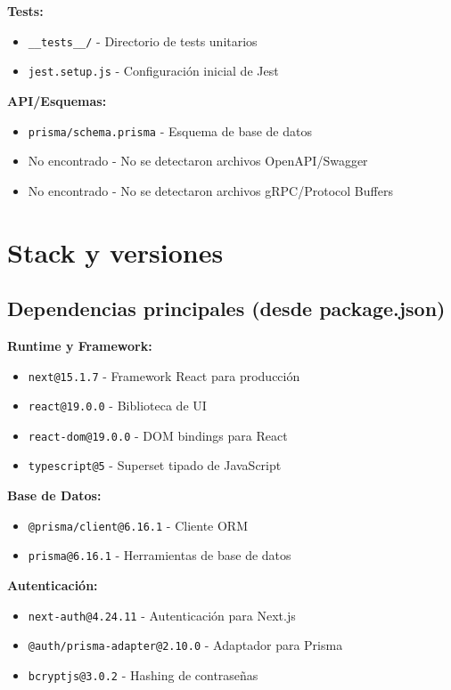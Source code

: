 \documentclass[12pt,a4paper]{article}
\begin{document}
\textbf{Tests:}
\begin{itemize}
    \item \texttt{\_\_tests\_\_/} - Directorio de tests unitarios
    \item \texttt{jest.setup.js} - Configuración inicial de Jest
\end{itemize}

\textbf{API/Esquemas:}
\begin{itemize}
    \item \texttt{prisma/schema.prisma} - Esquema de base de datos
    \item No encontrado - No se detectaron archivos OpenAPI/Swagger
    \item No encontrado - No se detectaron archivos gRPC/Protocol Buffers
\end{itemize}

\section{Stack y versiones}

\subsection{Dependencias principales (desde package.json)}

\textbf{Runtime y Framework:}
\begin{itemize}
    \item \texttt{next@15.1.7} - Framework React para producción
    \item \texttt{react@19.0.0} - Biblioteca de UI
    \item \texttt{react-dom@19.0.0} - DOM bindings para React
    \item \texttt{typescript@5} - Superset tipado de JavaScript
\end{itemize}

\textbf{Base de Datos:}
\begin{itemize}
    \item \texttt{@prisma/client@6.16.1} - Cliente ORM
    \item \texttt{prisma@6.16.1} - Herramientas de base de datos
\end{itemize}

\textbf{Autenticación:}
\begin{itemize}
    \item \texttt{next-auth@4.24.11} - Autenticación para Next.js
    \item \texttt{@auth/prisma-adapter@2.10.0} - Adaptador para Prisma
    \item \texttt{bcryptjs@3.0.2} - Hashing de contraseñas
\end{itemize}
\end{document}
